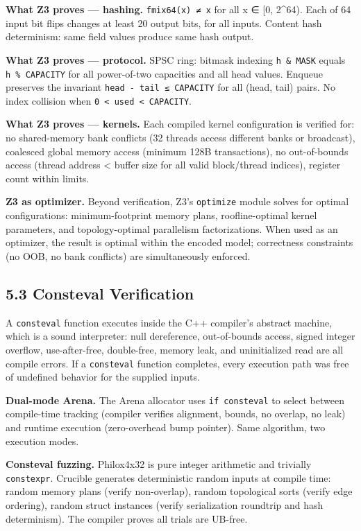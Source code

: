 \textbf{What Z3 proves --- hashing.} \texttt{fmix64(x)\ ≠\ x} for all x ∈ {[}0, 2\^{}64). Each of 64 input bit flips changes at least 20 output bits, for all inputs. Content hash determinism: same field values produce same hash output.

\textbf{What Z3 proves --- protocol.} SPSC ring: bitmask indexing \texttt{h\ \&\ MASK} equals \texttt{h\ \%\ CAPACITY} for all power-of-two capacities and all head values. Enqueue preserves the invariant \texttt{head\ -\ tail\ ≤\ CAPACITY} for all (head, tail) pairs. No index collision when \texttt{0\ \textless{}\ used\ \textless{}\ CAPACITY}.

\textbf{What Z3 proves --- kernels.} Each compiled kernel configuration is verified for: no shared-memory bank conflicts (32 threads access different banks or broadcast), coalesced global memory access (minimum 128B transactions), no out-of-bounds access (thread address \textless{} buffer size for all valid block/thread indices), register count within limits.

\textbf{Z3 as optimizer.} Beyond verification, Z3's \texttt{optimize} module solves for optimal configurations: minimum-footprint memory plans, roofline-optimal kernel parameters, and topology-optimal parallelism factorizations. When used as an optimizer, the result is optimal within the encoded model; correctness constraints (no OOB, no bank conflicts) are simultaneously enforced.

\subsection{5.3 Consteval Verification}\label{consteval-verification}

A \texttt{consteval} function executes inside the C++ compiler's abstract machine, which is a sound interpreter: null dereference, out-of-bounds access, signed integer overflow, use-after-free, double-free, memory leak, and uninitialized read are all compile errors. If a \texttt{consteval} function completes, every execution path was free of undefined behavior for the supplied inputs.

\textbf{Dual-mode Arena.} The Arena allocator uses \texttt{if\ consteval} to select between compile-time tracking (compiler verifies alignment, bounds, no overlap, no leak) and runtime execution (zero-overhead bump pointer). Same algorithm, two execution modes.

\textbf{Consteval fuzzing.} Philox4x32 is pure integer arithmetic and trivially \texttt{constexpr}. Crucible generates deterministic random inputs at compile time: random memory plans (verify non-overlap), random topological sorts (verify edge ordering), random struct instances (verify serialization roundtrip and hash determinism). The compiler proves all trials are UB-free.

